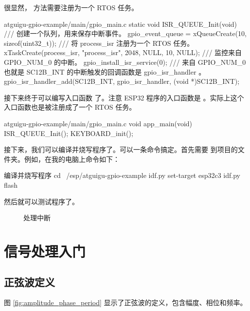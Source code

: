 \documentclass[lang=cn,newtx,10pt,scheme=chinese]{elegantbook}
\begin{document}
很显然， 方法需要注册为一个 RTOS 任务。

\begin{mycode}{atguigu-gpio-example/main/gpio\_main.c}
static void ISR_QUEUE_Init(void)
{
    /// 创建一个队列，用来保存中断事件。
    gpio_event_queue = xQueueCreate(10, sizeof(uint32_t));
    /// 将 process_isr 注册为一个 RTOS 任务。
    xTaskCreate(process_isr, "process_isr", 2048, NULL, 10, NULL);
    /// 监控来自 GPIO_NUM_0 的中断。
    gpio_install_isr_service(0);
    /// 来自 GPIO_NUM_0 也就是 SC12B_INT 的中断触发的回调函数是 gpio_isr_handler 。
    gpio_isr_handler_add(SC12B_INT, gpio_isr_handler, (void *)SC12B_INT);
}
\end{mycode}

接下来终于可以编写入口函数  了。注意 ESP32 程序的入口函数是  。实际上这个入口函数也是被注册成了一个 RTOS 任务。

\begin{mycode}{atguigu-gpio-example/main/gpio\_main.c}
void app_main(void)
{
    ISR_QUEUE_Init();
    KEYBOARD_init();
}
\end{mycode}

接下来，我们可以编译并烧写程序了。可以一条命令搞定。首先需要  到项目的文件夹。例如，在我的电脑上命令如下：

\begin{mycode}{编译并烧写程序}
cd ~/esp/atguigu-gpio-example
idf.py set-target esp32c3
idf.py flash
\end{mycode}

然后就可以测试程序了。

\begin{figure}[!htb]
    \centering
    \caption{处理中断}
\end{figure}

\chapter{信号处理入门}

\section{正弦波定义}

图 \ref{fig:amplitude_phase_period} 显示了正弦波的定义，包含幅度、相位和频率。
\end{document}
